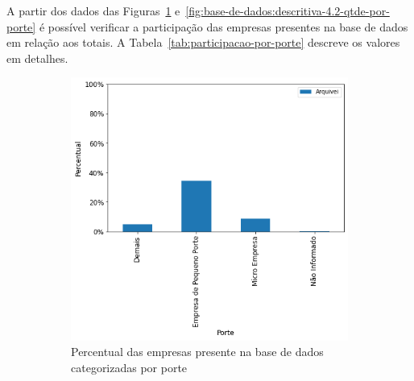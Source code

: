 A partir dos dados das Figuras~\ref{fig:base-de-dados:descritiva-4.1-presenca-por-porte} e~\ref{fig:base-de-dados:descritiva-4.2-qtde-por-porte} é possível verificar a participação das empresas presentes na base de dados em relação aos totais. A Tabela~\ref{tab:participacao-por-porte} descreve os valores em detalhes.

\begin{figure}[htb]
    \centering
    \caption{Participação por porte das empresas presentes na base de dados}
    \label{fig:base-de-dados:descritiva-4-presenca-por-porte}
    \begin{subfigure}[b]{0.45\textwidth} 
        \includegraphics[scale=0.45]{images/base-de-dados-4.1-presenca-por-porte.png}
        \caption{Percentual das empresas presente na base de dados categorizadas por porte}
        \label{fig:base-de-dados:descritiva-4.1-presenca-por-porte}
    \end{subfigure} ~ \quad
    \begin{subfigure}[b]{0.45\textwidth}

\end{subfigure}
\end{figure}
